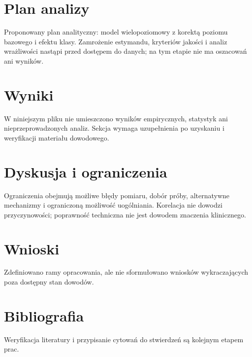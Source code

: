 \documentclass[11pt,a4paper]{article}
\begin{document}
\section{Plan analizy}

Proponowany plan analityczny: model wielopoziomowy z korektą poziomu bazowego i efektu klasy. Zamrożenie estymandu, kryteriów jakości i analiz wrażliwości nastąpi przed dostępem do danych; na tym etapie nie ma oszacowań ani wyników.

\section{Wyniki}

W niniejszym pliku nie umieszczono wyników empirycznych, statystyk ani nieprzeprowadzonych analiz. Sekcja wymaga uzupełnienia po uzyskaniu i weryfikacji materiału dowodowego.

\section{Dyskusja i ograniczenia}

Ograniczenia obejmują możliwe błędy pomiaru, dobór próby, alternatywne mechanizmy i ograniczoną możliwość uogólniania. Korelacja nie dowodzi przyczynowości; poprawność techniczna nie jest dowodem znaczenia klinicznego.

\section{Wnioski}

Zdefiniowano ramy opracowania, ale nie sformułowano wniosków wykraczających poza dostępny stan dowodów.

\section*{Bibliografia}

Weryfikacja literatury i przypisanie cytowań do stwierdzeń są kolejnym etapem prac.
\end{document}
